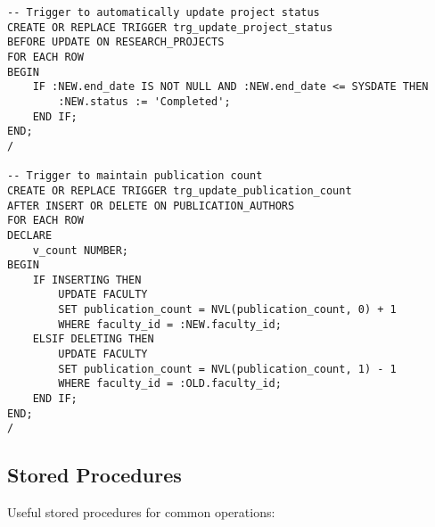 \documentclass[12pt,a4paper]{article}
\begin{document}
\begin{lstlisting}[style=sqlstyle]
-- Trigger to automatically update project status
CREATE OR REPLACE TRIGGER trg_update_project_status
BEFORE UPDATE ON RESEARCH_PROJECTS
FOR EACH ROW
BEGIN
    IF :NEW.end_date IS NOT NULL AND :NEW.end_date <= SYSDATE THEN
        :NEW.status := 'Completed';
    END IF;
END;
/

-- Trigger to maintain publication count
CREATE OR REPLACE TRIGGER trg_update_publication_count
AFTER INSERT OR DELETE ON PUBLICATION_AUTHORS
FOR EACH ROW
DECLARE
    v_count NUMBER;
BEGIN
    IF INSERTING THEN
        UPDATE FACULTY 
        SET publication_count = NVL(publication_count, 0) + 1
        WHERE faculty_id = :NEW.faculty_id;
    ELSIF DELETING THEN
        UPDATE FACULTY 
        SET publication_count = NVL(publication_count, 1) - 1
        WHERE faculty_id = :OLD.faculty_id;
    END IF;
END;
/
\end{lstlisting}

\subsection{Stored Procedures}
Useful stored procedures for common operations:
\end{document}
